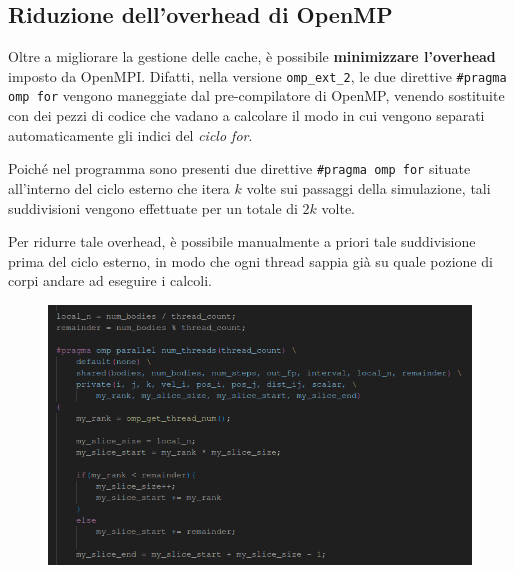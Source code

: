 \documentclass[12pt]{report}
\begin{document}
    \newpage
    
    \subsection{Riduzione dell'overhead di OpenMP}

    Oltre a migliorare la gestione delle cache, è possibile \textbf{minimizzare l'overhead} imposto da OpenMPI. Difatti, nella versione \texttt{omp\_ext\_2}, le due direttive \texttt{\#pragma omp for} vengono maneggiate dal pre-compilatore di OpenMP, venendo sostituite con dei pezzi di codice che vadano a calcolare il modo in cui vengono separati automaticamente gli indici del \textit{ciclo for}.

    Poiché nel programma sono presenti due direttive \texttt{\#pragma omp for} situate all'interno del ciclo esterno che itera $k$ volte sui passaggi della simulazione, tali suddivisioni vengono effettuate per un totale di $2k$ volte.

    Per ridurre tale overhead, è possibile manualmente a priori tale suddivisione prima del ciclo esterno, in modo che ogni thread sappia già su quale pozione di corpi andare ad eseguire i calcoli.
    
    \begin{figure}[H]
        \centering
        \includegraphics[width=\textwidth]{images/omp_ext_3_1.png}
    \end{figure}
\end{document}
